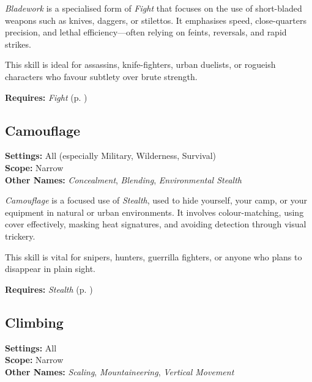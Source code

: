 \emph{Bladework} is a specialised form of \emph{Fight} that focuses on the use of short-bladed weapons such as knives, daggers, or stilettos. It emphasises speed, close-quarters precision, and lethal efficiency—often relying on feints, reversals, and rapid strikes.

This skill is ideal for assassins, knife-fighters, urban duelists, or rogueish characters who favour subtlety over brute strength.

\vspace{0.5\baselineskip}
\noindent\textbf{Requires:} \emph{Fight} (p. \pageref{skill:fight})



\subsection{Camouflage}\label{skill:camouflage}
\textbf{Settings:} All (especially Military, Wilderness, Survival)\\
\textbf{Scope:} Narrow\\
\textbf{Other Names:} \emph{Concealment}, \emph{Blending}, \emph{Environmental Stealth}\\
\vspace{\baselineskip}

\emph{Camouflage} is a focused use of \emph{Stealth}, used to hide yourself, your camp, or your equipment in natural or urban environments. It involves colour-matching, using cover effectively, masking heat signatures, and avoiding detection through visual trickery.

This skill is vital for snipers, hunters, guerrilla fighters, or anyone who plans to disappear in plain sight.

\vspace{0.5\baselineskip}
\noindent\textbf{Requires:} \emph{Stealth} (p. \pageref{skill:stealth})


\subsection{Climbing}\label{skill:climbing}
\textbf{Settings:} All\\
\textbf{Scope:} Narrow\\
\textbf{Other Names:} \emph{Scaling}, \emph{Mountaineering}, \emph{Vertical Movement}\\
\vspace{\baselineskip}

